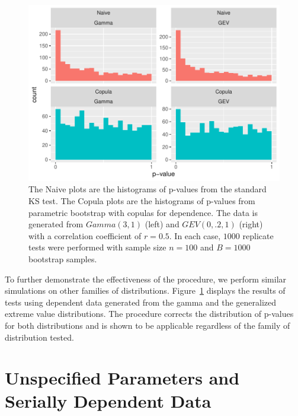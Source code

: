 \documentclass[12pt, letterpaper, titlepage]{article}
\begin{document}
\begin{figure}[tbp]
  \centering
  \includegraphics[width=\textwidth]{hist_gamma_gev_D}
  \caption{The Naive plots are the histograms of p-values from the standard KS
  test. The Copula plots are the histograms of p-values from parametric
  bootstrap with copulas for dependence. The data is generated from $Gamma(3,
  1)$ (left) and $GEV(0, .2, 1)$ (right) with a correlation coefficient of $r =
  0.5$. In each case, $1000$ replicate tests were performed with sample size $n
  = 100$ and $B = 1000$ bootstrap samples.}
  \label{fig:hist_gamma_gev_D}
\end{figure}

To further demonstrate the effectiveness of the procedure, we perform similar
simulations on other families of distributions.
Figure~\ref{fig:hist_gamma_gev_D} displays the results of tests using dependent
data generated from the gamma and the generalized extreme value distributions.
The procedure corrects the distribution of p-values for both distributions and
is shown to be applicable regardless of the family of distribution tested.


\section{Unspecified Parameters and Serially Dependent Data}
\label{sec:fittedwithdependence}
\end{document}
